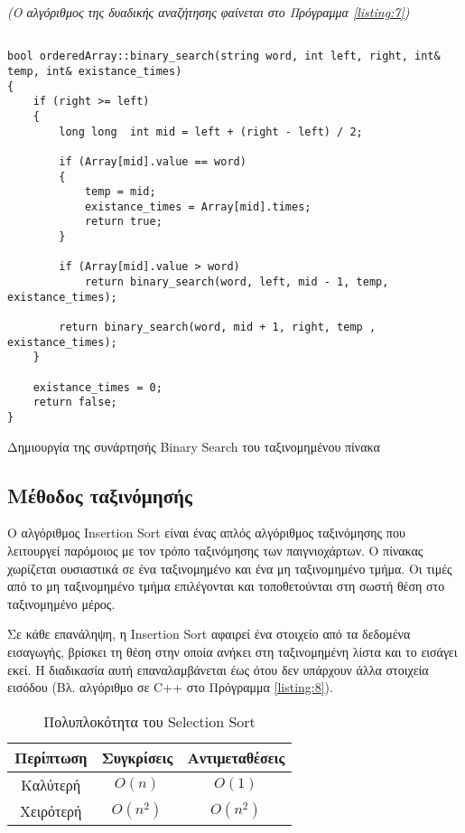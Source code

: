 \textit{(Ο αλγόριθμος της δυαδικής αναζήτησης φαίνεται στο Πρόγραμμα \ref{listing:7})}

\en
\begin{listing}[ht]
\begin{verbatim}

bool orderedArray::binary_search(string word, int left, right, int& temp, int& existance_times)
{
    if (right >= left)
    {
        long long  int mid = left + (right - left) / 2;

        if (Array[mid].value == word)
        {
            temp = mid;
            existance_times = Array[mid].times;
            return true;
        }
        
        if (Array[mid].value > word)
            return binary_search(word, left, mid - 1, temp, existance_times);

        return binary_search(word, mid + 1, right, temp , existance_times);
    }
    
    existance_times = 0;
    return false;
}

\end{verbatim}
\caption{Δημιουργία της συνάρτησής Binary Search του ταξινομημένου πίνακα}
\label{listing:7}
\end{listing}
\gr


\subsection{Μέθοδος ταξινόμησής}

Ο αλγόριθμος \en Insertion Sort \gr είναι ένας απλός αλγόριθμος ταξινόμησης που λειτουργεί παρόμοιος με τον τρόπο ταξινόμησης των παιγνιοχάρτων. Ο πίνακας χωρίζεται ουσιαστικά σε ένα ταξινομημένο και ένα μη ταξινομημένο τμήμα. Οι τιμές από το μη ταξινομημένο τμήμα επιλέγονται και τοποθετούνται στη σωστή θέση στο ταξινομημένο μέρος. 

Σε κάθε επανάληψη, η \en Insertion Sort \gr αφαιρεί ένα στοιχείο από τα δεδομένα εισαγωγής, βρίσκει τη θέση στην οποία ανήκει στη ταξινομημένη λίστα και το εισάγει εκεί. Η διαδικασία αυτή επαναλαμβάνεται έως ότου δεν υπάρχουν άλλα στοιχεία εισόδου (Βλ. αλγόριθμο σε \en C++ \gr στο Πρόγραμμα \ref{listing:8}).

\begin{table}[!h]
\centering
\begin{tabular}{||c c c||} 
 \hline
 Περίπτωση & Συγκρίσεις & Αντιμεταθέσεις \\
 \hline\hline
 Καλύτερή &  $O(n)$ & $O(1)$ \\
 Χειρότερή & $O(n^2)$ & $O(n^2)$ \\ 
 \hline
\end{tabular}
\caption{Πολυπλοκότητα του \en Selection Sort \gr}
\label{table:2}
\end{table}

